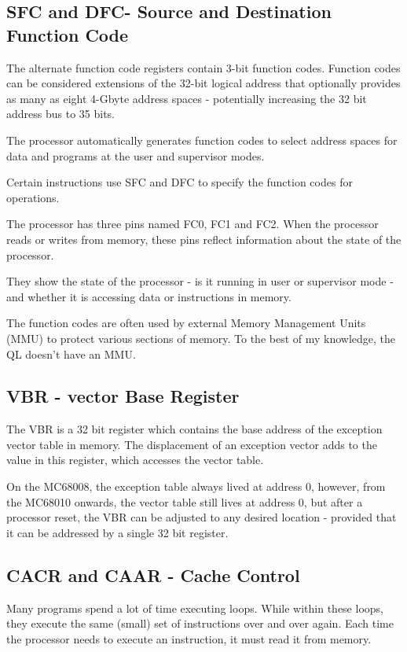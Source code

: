 \subsection{SFC and DFC- Source and Destination Function Code}

The alternate function code registers contain 3-bit function codes. Function codes can be considered extensions of the 32-bit logical address that optionally provides as many as eight 4-Gbyte address spaces - potentially increasing the 32 bit address bus to 35 bits.

The processor automatically generates function codes to select address spaces for data and programs at the user and supervisor modes. 

Certain instructions use SFC and DFC to specify the function codes for operations.

The processor has three pins named FC0, FC1 and FC2. When the processor reads or writes from memory, these pins reflect information about the state of the processor. 

They show the state of the processor - is it running in user or supervisor mode - and whether it is accessing data or instructions in memory.

The function codes are often used by external Memory Management Units (MMU) to protect various sections of memory. To the best of my knowledge, the QL doesn't have an MMU.

\subsection{VBR - vector Base Register}

The VBR is a 32 bit register which contains the base address of the exception vector table in memory. The displacement of an exception vector adds to the value in this register, which accesses the vector table.

On the MC68008, the exception table always lived at address 0, however, from the MC68010 onwards, the vector table still lives at address 0, but after a processor reset, the VBR can be adjusted to any desired location - provided that it can be addressed by a single 32 bit register.

\subsection{CACR and CAAR - Cache Control}

Many programs spend a lot of time executing loops. While within these loops, they execute the same (small) set of instructions over and over again. Each time the processor needs to execute an instruction, it must read it from memory.

